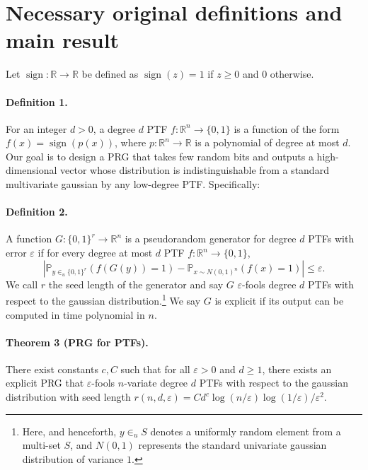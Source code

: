 \section*{Necessary original definitions and main result}
Let $\operatorname{sign}:\mathbb R\to\mathbb R$ be defined as $\operatorname{sign}(z)=1$ if $z\geq0$ and $0$ otherwise.
\paragraph{Definition 1.} For an integer $d>0$, a degree $d$ PTF $f:\mathbb R^n\to\{0,1\}$ is a function of the form $f(x)=\operatorname{sign}(p(x))$, where $p:\mathbb R^n\to\mathbb R$ is a polynomial of degree at most $d$.
Our goal is to design a PRG that takes few random bits and outputs a high-dimensional vector whose distribution is indistinguishable from a standard multivariate gaussian by any low-degree PTF. Specifically:
\paragraph{Definition 2.} A function $G:\{0,1\}^r\to\mathbb R^n$ is a pseudorandom generator for degree $d$ PTFs with error $\varepsilon$ if for every degree at most $d$ PTF $f:\mathbb R^n\to\{0,1\}$,
\[\left|\mathbb P_{y\in_u\{0,1\}^r}(f(G(y))=1)-\mathbb P_{x\sim N(0,1)^n}(f(x)=1)\right|\leq\varepsilon.\]
We call $r$ the seed length of the generator and say $G$ $\varepsilon$-fools degree $d$ PTFs with respect to the gaussian distribution.\footnote{Here, and henceforth, $y\in_u S$ denotes a uniformly random element from a multi-set $S$, and $N(0,1)$ represents the standard univariate gaussian distribution of variance $1$.} We say $G$ is explicit if its output can be computed in time polynomial in $n$.
\paragraph{Theorem 3 (PRG for PTFs).} There exist constants $c,C$ such that for all $\varepsilon>0$ and $d\geq1$, there exists an explicit PRG that $\varepsilon$-fools $n$-variate degree $d$ PTFs with respect to the gaussian distribution with seed length $r(n,d,\varepsilon)=Cd^c\log(n/\varepsilon)\log(1/\varepsilon)/\varepsilon^2$.
